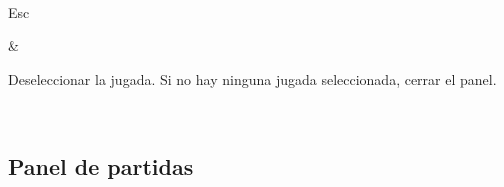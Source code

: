 \documentclass[letterpaper,10pt,spanish]{sphinxmanual}
\begin{document}
\begin{savenotes}
\begin{tabular}[t]{}
\begin{varwidth}[t]{}
\end{varwidth}%
\\
\sphinxhline\begin{varwidth}[t]{}
\sphinxAtStartPar
Esc
\sphinxbeforeendvarwidth
\end{varwidth}%
&\begin{varwidth}[t]{}
\sphinxAtStartPar
Deseleccionar la jugada. Si no hay ninguna jugada seleccionada, cerrar el panel.
\sphinxbeforeendvarwidth
\end{varwidth}%
\\
\sphinxbottomrule
\end{tabular}
\sphinxtableafterendhook\par
\sphinxattableend\end{savenotes}


\subsection{Panel de partidas}
\label{\detokenize{raccourcis:panneau-des-matchs}}\label{\detokenize{raccourcis:raccourcis-match-panel}}
\end{document}
